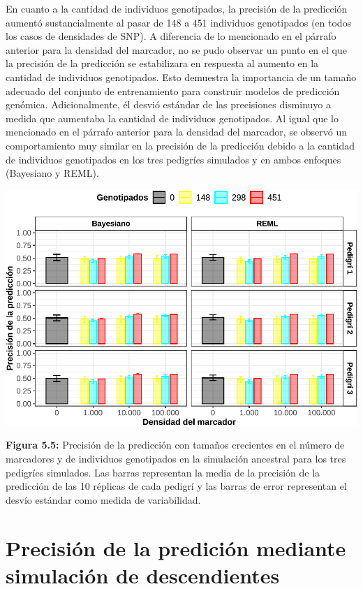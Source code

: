 \documentclass[11pt,spanish,a4paper,oneside,]{book} %
\begin{document}
En cuanto a la cantidad de individuos genotipados, la precisión de la predicción aumentó sustancialmente al pasar de 148 a 451 individuos genotipados (en todos los casos de densidades de SNP). A diferencia de lo mencionado en el párrafo anterior para la densidad del marcador, no se pudo observar un punto en el que la precisión de la predicción se estabilizara en respuesta al aumento en la cantidad de individuos genotipados. Esto demuestra la importancia de un tamaño adecuado del conjunto de entrenamiento para construir modelos de predicción genómica. Adicionalmente, él desvió estándar de las precisiones disminuyo a medida que aumentaba la cantidad de individuos genotipados. Al igual que lo mencionado en el párrafo anterior para la densidad del marcador, se observó un comportamiento muy similar en la precisión de la predicción debido a la cantidad de individuos genotipados en los tres pedigríes simulados y en ambos enfoques (Bayesiano y REML).

\begin{center}\includegraphics[width=1\linewidth]{figures/Cor_Bay_Pen_2} \end{center}

\noindent
\textbf{Figura 5.5:} Precisión de la predicción con tamaños crecientes en el número de marcadores y de individuos genotipados en la simulación ancestral para los tres pedigríes simulados. Las barras representan la media de la precisión de la predicción de las 10 réplicas de cada pedigrí y las barras de error representan el desvío estándar como medida de variabilidad.

\hypertarget{precisiuxf3n-de-la-prediciuxf3n-mediante-simulaciuxf3n-de-descendientes-1}{%
\section{Precisión de la predición mediante simulación de descendientes}\label{precisiuxf3n-de-la-prediciuxf3n-mediante-simulaciuxf3n-de-descendientes-1}}
\end{document}
